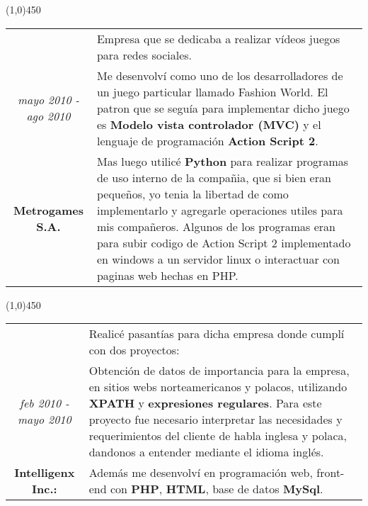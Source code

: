 \begin{center}
\line(1,0){450}
\end{center}
\noindent
\begin{tabular}{c|p{12.5cm}}
& \large Empresa que se dedicaba a realizar vídeos juegos para redes sociales.\\
\large\textit{mayo 2010 - ago 2010} &  \large Me desenvolví como uno de los desarrolladores de un juego particular llamado Fashion World. El patron que se seguía para implementar dicho juego es \textbf{Modelo vista controlador (MVC)} y el lenguaje de programación \textbf{Action Script 2}.\\
\large\textbf{Metrogames S.A.} & \large Mas luego utilicé \textbf{Python} para realizar programas de uso interno de la compañia, que si bien eran pequeños, yo tenia la libertad de como implementarlo y agregarle operaciones utiles para mis compañeros. Algunos de los programas eran para subir codigo de Action Script 2 implementado en windows a un servidor linux o interactuar con paginas web hechas en PHP.
\end{tabular}

\begin{center}
\line(1,0){450}
\end{center}
\noindent
\begin{tabular}{c|p{12.5cm}}
& \large Realicé pasantías para dicha empresa donde cumplí con dos proyectos:\\
\large\textit{feb 2010 - mayo 2010} & \large Obtención de datos de importancia para la empresa, en sitios webs norteamericanos y polacos, utilizando \textbf{XPATH} y \textbf{expresiones regulares}. Para este proyecto fue necesario interpretar las necesidades y requerimientos del cliente de habla inglesa y polaca, dandonos a entender mediante el idioma inglés.\\
\large\textbf{Intelligenx Inc.:} & \large Además me desenvolví en programación web, front-end con \textbf{PHP}, \textbf{HTML}, base de datos \textbf{MySql}.
\end{tabular}

